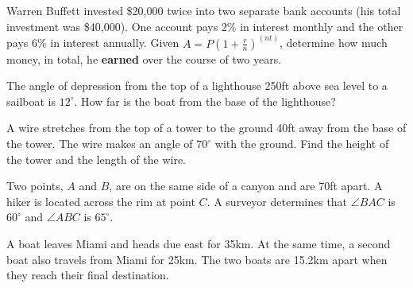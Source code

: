 \documentclass[addpoints]{exam}
\begin{document}
\begin{questions}
    \question[1] Warren Buffett invested \$20,000 twice into two separate bank accounts (his total investment was \$40,000). One account pays 2\% in interest monthly and the other pays 6\% in interest annually. Given $A = P(1 + \frac{r}{n})^{(nt)}$, determine how much money, in total, he \textbf{earned} over the course of two years. 
    
    
    \question[1] The angle of depression from the top of a lighthouse 250ft above sea level to a sailboat is $12^\circ$. How far is the boat from the base of the lighthouse? 

    \question[1] A wire stretches from the top of a tower to the ground 40ft away from the base of the tower. The wire makes an angle of $70^\circ$ with the ground. Find the height of the tower and the length of the wire. 
    
    \newpage
    
    \question[1] Two points, $A$ and $B$, are on the same side of a canyon and are 70ft apart. A hiker is located across the rim at point $C$. A surveyor determines that $\angle BAC$ is $60^\circ$ and $\angle ABC$ is $65^\circ$.
     
    \question[1] A boat leaves Miami and heads due east for 35km. At the same time, a second boat also travels from Miami for 25km. The two boats are 15.2km apart when they reach their final destination.
\end{questions}
\end{document}
